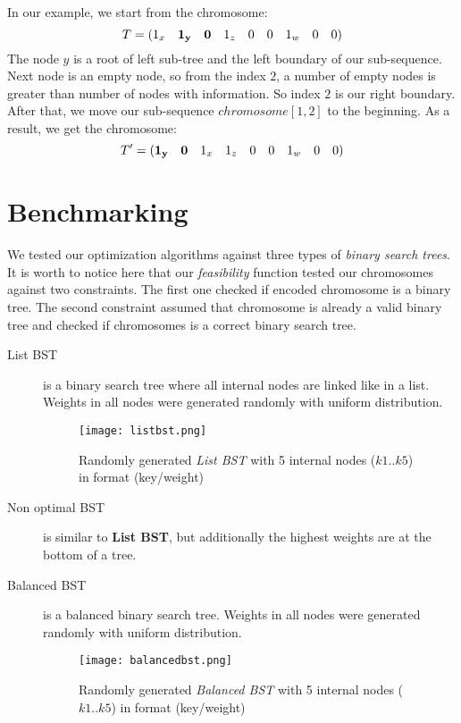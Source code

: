 \documentclass[12pt]{article}
\begin{document}
In our example, we start from the chromosome:
\[
    T = (1_x \quad {\bf 1_y\quad 0} \quad 1_z \quad 0 \quad 0 \quad 1_w \quad 0 \quad 0)
\]
The node $y$ is a root of left sub-tree and the left boundary of our sub-sequence. Next node is an empty node, so from the index $2$, a number of empty nodes is greater than number of nodes with information. So index $2$ is our right boundary. After that, we move our sub-sequence $chromosome[1, 2]$ to the beginning. As a result, we get the chromosome:
\[
    T' = ({\bf 1_y\quad 0} \quad 1_x \quad  1_z \quad 0 \quad 0 \quad 1_w \quad 0 \quad 0)
\]


\clearpage


\section{Benchmarking}
We tested our optimization algorithms against three types of \textit{binary search trees}. It is worth to notice here that our \textit{feasibility} function tested our chromosomes against two constraints. The first one checked if encoded chromosome is a binary tree. The second constraint assumed that chromosome is already a valid binary tree and checked if chromosomes is a correct binary search tree.

\begin{description}
\item[List BST] is a binary search tree where all internal nodes are linked like in a list. Weights in all nodes were generated randomly with uniform distribution.
\begin{figure}[ht]
\centering
\texttt{[image: listbst.png]}
\caption{Randomly generated \textit{List BST} with 5 internal nodes ($k1..k5$) in format (key/weight)}
\label{fig:listbst}
\end{figure}


\item[Non optimal BST] is similar to \textbf{List BST}, but additionally the highest weights are at the bottom of a tree.
\item[Balanced BST] is a balanced binary search tree. Weights in all nodes were generated randomly with uniform distribution.
\begin{figure}[ht]
\centering
\texttt{[image: balancedbst.png]}
\caption{Randomly generated \textit{Balanced BST} with 5 internal nodes ($k1..k5$) in format (key/weight)}
\label{fig:balancedbst}
\end{figure}
\end{description}
\end{document}
